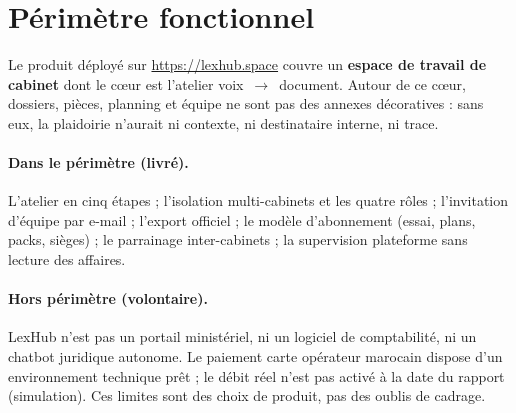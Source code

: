 \section{Périmètre fonctionnel}
\label{sec:perimetre}

Le produit déployé sur \url{https://lexhub.space} couvre un \textbf{espace de travail de cabinet} dont le cœur est l'atelier voix~$\rightarrow$~document. Autour de ce cœur, dossiers, pièces, planning et équipe ne sont pas des annexes décoratives : sans eux, la plaidoirie n'aurait ni contexte, ni destinataire interne, ni trace.

\paragraph{Dans le périmètre (livré).}
L'atelier en cinq étapes ; l'isolation multi-cabinets et les quatre rôles ; l'invitation d'équipe par e-mail ; l'export officiel ; le modèle d'abonnement (essai, plans, packs, sièges) ; le parrainage inter-cabinets ; la supervision plateforme sans lecture des affaires.

\paragraph{Hors périmètre (volontaire).}
LexHub n'est pas un portail ministériel, ni un logiciel de comptabilité, ni un chatbot juridique autonome. Le paiement carte opérateur marocain dispose d'un environnement technique prêt ; le débit réel n'est pas activé à la date du rapport (simulation). Ces limites sont des choix de produit, pas des oublis de cadrage.
